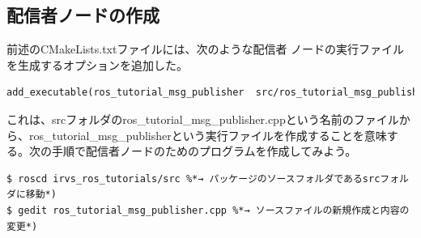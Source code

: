 \subsection{配信者ノードの作成}

前述のCMakeLists.txtファイルには、次のような配信者  ノードの実行ファイルを生成するオプションを追加した。

\begin{lstlisting}[language=make]
add_executable(ros_tutorial_msg_publisher  src/ros_tutorial_msg_publisher.cpp)
\end{lstlisting}

これは、srcフォルダのros\_tutorial\_msg\_publisher.cppという名前のファイルから、ros\_tutorial\_msg\_publisherという実行ファイルを作成することを意味する。次の手順で配信者ノードのためのプログラムを作成してみよう。

\begin{lstlisting}[language=ROS]
$ roscd irvs_ros_tutorials/src %*→ パッケージのソースフォルダであるsrcフォルダに移動*)
$ gedit ros_tutorial_msg_publisher.cpp %*→ ソースファイルの新規作成と内容の変更*)
\end{lstlisting}

